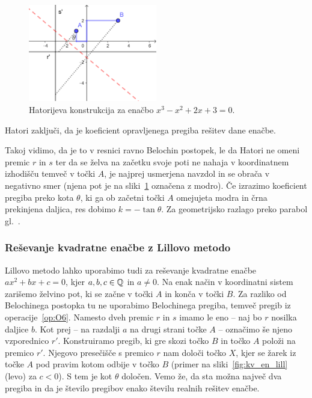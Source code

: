 \begin{figure}[h!]
    \centering
    \includegraphics[width=0.5\textwidth]{images/kubična enačba/hatori.png}
    \caption[Hatorijeva konstrukcija]{Hatorijeva konstrukcija za enačbo $x^3 - x^2 + 2x + 3 = 0$.}
    \label{fig:hatori}
\end{figure}

Hatori zaključi, da je koeficient opravljenega pregiba rešitev dane enačbe.

Takoj vidimo, da je to v resnici ravno Belochin postopek, le da Hatori ne omeni premic $r$ in $s$ ter da se želva na začetku svoje poti ne nahaja v koordinatnem izhodišču temveč v točki $A$, je najprej usmerjena navzdol in se obrača v negativno smer (njena pot je na sliki~\ref{fig:hatori} označena z modro). Če izrazimo koeficient pregiba preko kota $\theta$, ki ga ob začetni točki $A$ omejujeta modra in črna prekinjena daljica, res dobimo $k = - \tan \theta$. Za geometrijsko razlago preko parabol gl.~\cite{hatori2003}.


\subsubsection{Reševanje kvadratne enačbe z Lillovo metodo}
\label{podpodl:kvadr_en_lill}

Lillovo metodo lahko uporabimo tudi za reševanje kvadratne enačbe $a x^2 + b x + c = 0$, kjer $a, b, c \in \mathbb Q$ in $a \neq 0$. Na enak način v koordinatni sistem zarišemo želvino pot, ki se začne v točki $A$ in konča v točki $B$. Za razliko od Belochinega postopka tu ne uporabimo Belochinega pregiba, temveč pregib iz operacije~\ref{op:O6}. Namesto dveh premic $r$ in $s$ imamo le eno -- naj bo $r$ nosilka daljice $b$. Kot prej -- na razdalji $a$ na drugi strani točke $A$ -- označimo še njeno vzporednico $r'$. Konstruiramo pregib, ki gre skozi točko $B$ in točko $A$ položi na premico $r'$. Njegovo presečišče s premico $r$ nam določi točko $X$, kjer se žarek iz točke $A$ pod pravim kotom odbije v točko $B$ (primer na sliki~\ref{fig:kv_en_lill} (levo) za $c < 0$). S tem je kot $\theta$ določen. Vemo že, da sta možna največ dva pregiba in da je število pregibov enako številu realnih rešitev enačbe.

